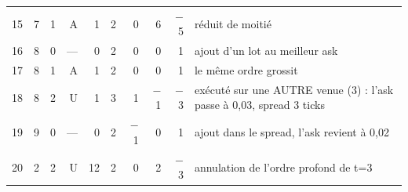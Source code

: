 \begin{tabular}{rrrrrrrrrl}
15 & 7 & 1 & A & 1 & 2 & 0 & 6 & $-$5 & \parbox[t]{6.2cm}{\raggedright\scriptsize réduit de moitié}\\
16 & 8 & 0 & — & 0 & 2 & 0 & 0 & 1 & \parbox[t]{6.2cm}{\raggedright\scriptsize ajout d'un lot au meilleur ask}\\
17 & 8 & 1 & A & 1 & 2 & 0 & 0 & 1 & \parbox[t]{6.2cm}{\raggedright\scriptsize le même ordre grossit}\\
18 & 8 & 2 & U & 1 & 3 & 1 & $-$1 & $-$3 & \parbox[t]{6.2cm}{\raggedright\scriptsize exécuté sur une AUTRE venue (3) : l'ask passe à 0,03, spread 3 ticks}\\
19 & 9 & 0 & — & 0 & 2 & $-$1 & 0 & 1 & \parbox[t]{6.2cm}{\raggedright\scriptsize ajout dans le spread, l'ask revient à 0,02}\\
20 & 2 & 2 & U & 12 & 2 & 0 & 2 & $-$3 & \parbox[t]{6.2cm}{\raggedright\scriptsize annulation de l'ordre profond de t=3}\\
\bottomrule
\end{tabular}